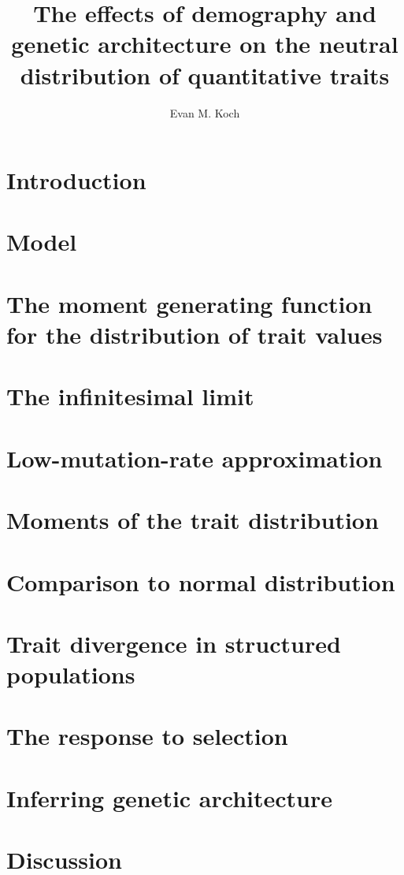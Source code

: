 \documentclass{article}
\begin{document}
\title{The effects of demography and genetic architecture on the neutral distribution of quantitative traits}
\author{Evan M. Koch}
\maketitle

\section{Introduction}

\section{Model}

\section{The moment generating function for the distribution of trait values}

\section{The infinitesimal limit}

\section{Low-mutation-rate approximation}

\section{Moments of the trait distribution}

\section{Comparison to normal distribution}

\section{Trait divergence in structured populations}

\section{The response to selection}

\section{Inferring genetic architecture}

\section{Discussion}

 

\clearpage
\end{document}
